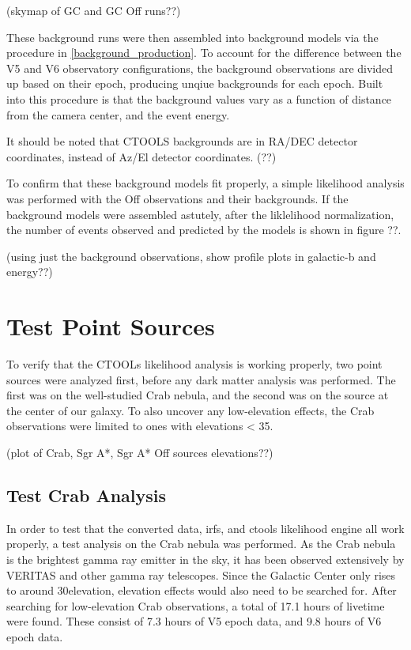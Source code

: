   (skymap of GC and GC Off runs??)

  These background runs were then assembled into background models via the procedure in \ref{background_production}.
  To account for the difference between the V5 and V6 observatory configurations, the background observations are divided up based on their epoch, producing unqiue backgrounds for each epoch.
  Built into this procedure is that the background values vary as a function of distance from the camera center, and the event energy.

  It should be noted that CTOOLS backgrounds are in RA/DEC detector coordinates, instead of Az/El detector coordinates. (??)

  To confirm that these background models fit properly, a simple likelihood analysis was performed with the Off observations and their backgrounds.
  If the background models were assembled astutely, after the liklelihood normalization, the number of events observed and predicted by the models is shown in figure ??.

  (using just the background observations, show profile plots in galactic-b and energy??)

\section{Test Point Sources}
  To verify that the CTOOLs likelihood analysis is working properly, two point sources were analyzed first, before any dark matter analysis was performed.
  The first was on the well-studied Crab nebula, and the second was on the source at the center of our galaxy.
  To also uncover any low-elevation effects, the Crab observations were limited to ones with elevations < 35\degree.

  (plot of Crab, Sgr A*, Sgr A* Off sources elevations??)

  \subsection{Test Crab Analysis}

    In order to test that the converted data, irfs, and ctools likelihood engine all work properly, a test analysis on the Crab nebula was performed.
    As the Crab nebula is the brightest gamma ray emitter in the sky, it has been observed extensively by VERITAS and other gamma ray telescopes.
    Since the Galactic Center only rises to around 30\degree elevation, elevation effects would also need to be searched for.
    After searching for low-elevation Crab observations, a total of 17.1 hours of livetime were found.
    These consist of 7.3 hours of V5 epoch data, and 9.8 hours of V6 epoch data.

